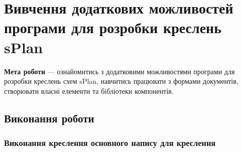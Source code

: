 \BorderFirstPage
{}
\chapter[~]{Вивчення додаткових можливостей програми для розробки креслень sPlan}

\textbf{Мета роботи} --- ознайомитись з додатковими можливостями програми для розробки креслень схем
sPlan, навчитись працювати з формами документів, створювати власні елементи та бібліотеки
компонентів.

\section{Виконання роботи}
\subsection{Виконання креслення основного напису для креслення}

